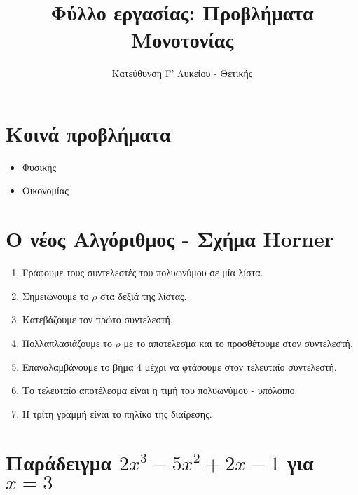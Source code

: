 \documentclass[a4paper,12pt]{article}
\title{\textbf{Φύλλο εργασίας: Προβλήματα Μονοτονίας}}
\author{Κατεύθυνση Γ' Λυκείου - Θετικής}
\date{}
\begin{document}
\maketitle

\section{Κοινά προβλήματα}
\begin{itemize}
  \item Φυσικής
  \item Οικονομίας

\end{itemize}

\section*{Ο νέος Αλγόριθμος - Σχήμα Horner}
\begin{enumerate}
  \item Γράφουμε τους συντελεστές του πολυωνύμου σε μία λίστα.
  \item Σημειώνουμε το $ρ$ στα δεξιά της λίστας.
  \item Κατεβάζουμε τον πρώτο συντελεστή.
  \item Πολλαπλασιάζουμε το $ρ$ με το αποτέλεσμα και το προσθέτουμε στον συντελεστή.
  \item Επαναλαμβάνουμε το βήμα 4 μέχρι να φτάσουμε στον τελευταίο συντελεστή.
  \item Το τελευταίο αποτέλεσμα είναι η τιμή του πολυωνύμου - υπόλοιπο.
  \item Η τρίτη γραμμή είναι το πηλίκο της διαίρεσης.
\end{enumerate}

\section*{Παράδειγμα ${2x^3-5x^2+2x-1}$ για $x = 3$}

 \hspace{1cm}
 \hspace{1cm}
 \hspace{1cm} \vspace{1cm}

 \hspace{1cm}
\hspace{1cm}
\hspace{1cm}\vspace{1cm}
\end{document}

